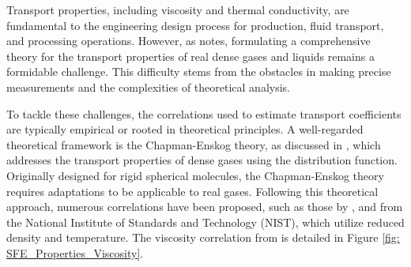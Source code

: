 \documentclass[../Article_Model_Parameters.tex]{subfiles}
\begin{document}
	
	
	Transport properties, including viscosity and thermal conductivity, are fundamental to the engineering design process for production, fluid transport, and processing operations. However, as \citet{Sheng1989} notes, formulating a comprehensive theory for the transport properties of real dense gases and liquids remains a formidable challenge. This difficulty stems from the obstacles in making precise measurements and the complexities of theoretical analysis.
	
	To tackle these challenges, the correlations used to estimate transport coefficients are typically empirical or rooted in theoretical principles. A well-regarded theoretical framework is the Chapman-Enskog theory, as discussed in \citet{Chapman1991}, which addresses the transport properties of dense gases using the distribution function. Originally designed for rigid spherical molecules, the Chapman-Enskog theory requires adaptations to be applicable to real gases. Following this theoretical approach, numerous correlations have been proposed, such as those by \citet{Fenghour1998}, and \citet{Laesecke2017} from the National Institute of Standards and Technology (NIST), which utilize reduced density and temperature. The viscosity correlation from \citet{Laesecke2017} is detailed in Figure \ref{fig: SFE_Properties_Viscosity}.
	
\end{document}
